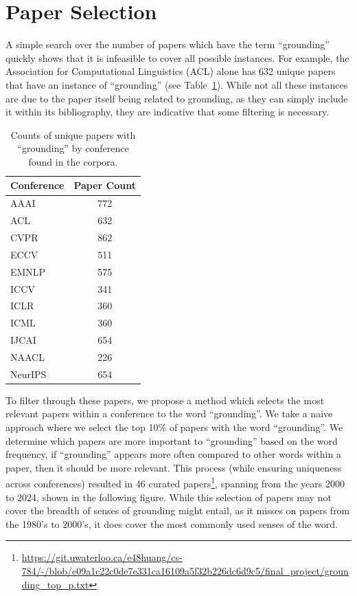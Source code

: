 \documentclass[11pt]{article}
\begin{document}
\section{Paper Selection}
A simple search over the number of papers which have the term ``grounding'' quickly shows that it is infeasible to cover all possible instances. For example, the Association for Computational Linguistics (ACL) alone has 632 unique papers that have an instance of ``grounding'' (see Table~\ref{tab:counts}). While not all these instances are due to the paper itself being related to grounding, as they can simply include it within its bibliography, they are indicative that some filtering is necessary.

\begin{table}
  \centering
  \begin{tabular}{lc}
    \hline
    \textbf{Conference} & \textbf{Paper Count} \\
    \hline
    {AAAI}     & {772}           \\
    {ACL}     & {632}           \\
    {CVPR}     & {862}           \\
    {ECCV}     & {511}           \\
    {EMNLP}     & {575}           \\
    {ICCV}     & {341}           \\
    {ICLR}     & {360}           \\
    {ICML}     & {360}           \\
    {IJCAI}     & {654}           \\
    {NAACL}     & {226}           \\
    {NeurIPS}     & {654}           \\\hline
  \end{tabular}
  \caption{Counts of unique papers with ``grounding'' by conference found in the corpora.}
  \label{tab:counts}
\end{table}

To filter through these papers, we propose a method which selects the most relevant papers within a conference to the word ``grounding''. We take a naive approach where we select the top 10\% of papers with the word ``grounding''. We determine which papers are more important to ``grounding'' based on the word frequency, if ``grounding'' appears more often compared to other words within a paper, then it should be more relevant. This process (while ensuring uniqueness across conferences) resulted in 46 curated papers\footnote{\url{https://git.uwaterloo.ca/e48huang/cs-784/-/blob/e09a1c22c0de7e331ca16109a5f32b226dc6d9c5/final_project/grounding_top_p.txt}}, spanning from the years 2000 to 2024, shown in the following figure. While this selection of papers may not cover the breadth of senses of grounding might entail, as it misses on papers from the 1980's to 2000's, it does cover the most commonly used senses of the word.
\end{document}
